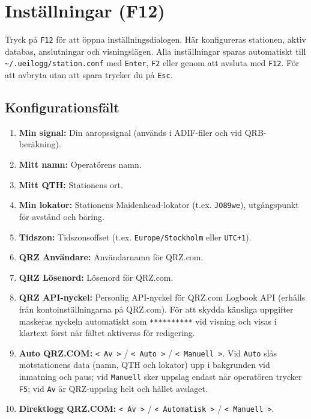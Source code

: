 \documentclass[11pt,a4paper]{article}
\begin{document}
\section{Inställningar (F12)}
\label{sec:settings}

Tryck på \texttt{F12} för att öppna inställningsdialogen. Här konfigureras stationen, aktiv databas, anslutningar och visningslägen. Alla inställningar sparas automatiskt till \texttt{\textasciitilde/.ueilogg/station.conf} med \texttt{Enter}, \texttt{F2} eller genom att avsluta med \texttt{F12}. För att avbryta utan att spara trycker du på \texttt{Esc}.

\subsection{Konfigurationsfält}
\begin{enumerate}
    \item \textbf{Min signal:} Din anropssignal (används i ADIF-filer och vid QRB-beräkning).
    \item \textbf{Mitt namn:} Operatörens namn.
    \item \textbf{Mitt QTH:} Stationens ort.
    \item \textbf{Min lokator:} Stationens Maidenhead-lokator (t.ex. \texttt{JO89we}), utgångspunkt för avstånd och bäring.
    \item \textbf{Tidszon:} Tidszonsoffset (t.ex. \texttt{Europe/Stockholm} eller \texttt{UTC+1}).
    \item \textbf{QRZ Användare:} Användarnamn för QRZ.com.
    \item \textbf{QRZ Lösenord:} Lösenord för QRZ.com.
    \item \textbf{QRZ API-nyckel:} Personlig API-nyckel för QRZ.com Logbook API (erhålls från kontoinställningarna på QRZ.com). För att skydda känsliga uppgifter maskeras nyckeln automatiskt som \texttt{**********} vid visning och visas i klartext först när fältet aktiveras för redigering.
    \item \textbf{Auto QRZ.COM:} \texttt{< Av >} / \texttt{< Auto >} / \texttt{< Manuell >}. Vid \texttt{Auto} slås motstationens data (namn, QTH och lokator) upp i bakgrunden vid inmatning och paus; vid \texttt{Manuell} sker uppslag endast när operatören trycker \texttt{F5}; vid \texttt{Av} är QRZ-uppslag helt och hållet avslaget.
    \item \textbf{Direktlogg QRZ.COM:} \texttt{< Av >} / \texttt{< Automatisk >} / \texttt{< Manuell >}.
    \begin{itemize}

\end{itemize}
\end{enumerate}
\end{document}
